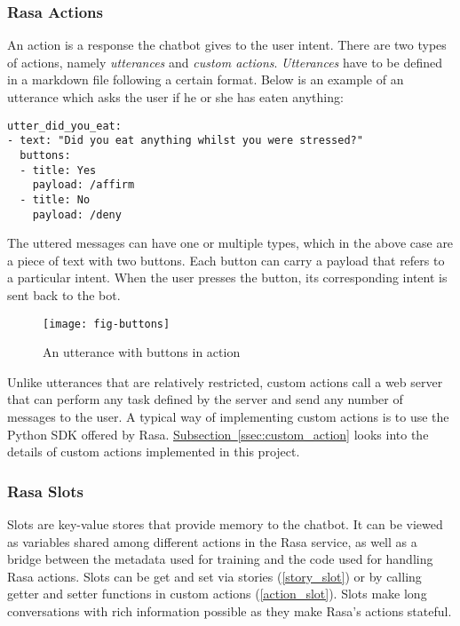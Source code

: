 \bigskip
\subsubsection{Rasa Actions}
An action is a response the chatbot gives to the user intent. There are two types of actions, namely \emph{utterances} and \emph{custom actions}. \emph{Utterances} have to be defined in a markdown file following a certain format. Below is an example of an utterance which asks the user if he or she has eaten anything:\bigskip

\begin{lstlisting}
utter_did_you_eat:
- text: "Did you eat anything whilst you were stressed?"
  buttons:
  - title: Yes
    payload: /affirm
  - title: No
    payload: /deny
\end{lstlisting}

\bigskip
The uttered messages can have one or multiple types, which in the above case are a piece of text with two buttons. Each button can carry a payload that refers to a particular intent. When the user presses the button, its corresponding intent is sent back to the bot.\bigskip

\begin{figure}[ht]
  \centering
  \texttt{[image: fig-buttons]}
  \caption{An utterance with buttons in action}
  \label{fig:buttons}
\end{figure}

Unlike utterances that are relatively restricted, custom actions call a web server that can perform any task defined by the server and send any number of messages to the user. A typical way of implementing custom actions is to use the Python SDK offered by Rasa. \hyperref[ssec:custom_action]{Subsection~\ref*{ssec:custom_action}} looks into the details of custom actions implemented in this project.

\subsubsection{Rasa Slots}
Slots are key-value stores that provide memory to the chatbot. It can be viewed as variables shared among different actions in the Rasa service, as well as a bridge between the metadata used for training and the code used for handling Rasa actions. Slots can be get and set via stories (\autoref{story_slot}) or by calling getter and setter functions in custom actions (\autoref{action_slot}). Slots make long conversations with rich information possible as they make Rasa's actions stateful.\bigskip

